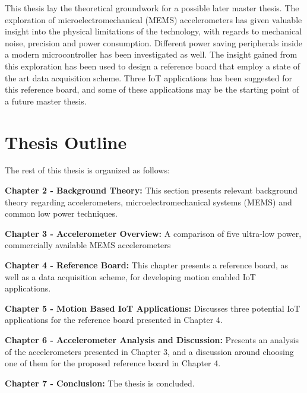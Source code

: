 This thesis lay the theoretical groundwork for a possible later master thesis. The exploration of microelectromechanical (MEMS) accelerometers has given valuable insight into the physical limitations of the technology, with regards to mechanical noise, precision and power consumption. Different power saving peripherals inside a modern microcontroller has been investigated as well. The insight gained from this exploration has been used to design a reference board that employ a state of the art data acquisition scheme. Three IoT applications has been suggested for this reference board, and some of these applications may be the starting point of a future master thesis.

\newpage

\section{Thesis Outline}

The rest of this thesis is organized as follows:

\textbf{Chapter 2 - Background Theory:} This section presents relevant background theory regarding accelerometers, microelectromechanical systems (MEMS) and common low power techniques.  

\textbf{Chapter 3 - Accelerometer Overview:} A comparison of five ultra-low power, commercially available MEMS accelerometers

\textbf{Chapter 4 - Reference Board:} This chapter presents a reference board, as well as a data acquisition scheme, for developing motion enabled IoT applications.

\textbf{Chapter 5 - Motion Based IoT Applications:} Discusses three potential IoT applications for the reference board presented in Chapter 4.

\textbf{Chapter 6 - Accelerometer Analysis and Discussion:} Presents an analysis of the accelerometers presented in Chapter 3, and a discussion around choosing one of them for the proposed reference board in Chapter 4.

\textbf{Chapter 7 - Conclusion:} The thesis is concluded.

